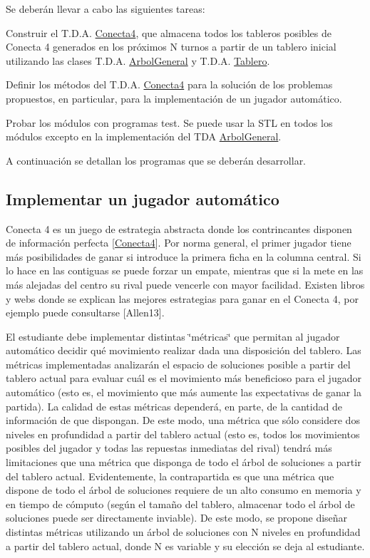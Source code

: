 Se deberán llevar a cabo las siguientes tareas\+:


\begin{DoxyEnumerate}
\item Construir el T.\+D.\+A. \hyperlink{classConecta4}{Conecta4}, que almacena todos los tableros posibles de Conecta 4 generados en los próximos N turnos a partir de un tablero inicial utilizando las clases T.\+D.\+A. \hyperlink{classArbolGeneral}{Arbol\+General} y T.\+D.\+A. \hyperlink{classTablero}{Tablero}.
\item Definir los métodos del T.\+D.\+A. \hyperlink{classConecta4}{Conecta4} para la solución de los problemas propuestos, en particular, para la implementación de un jugador automático.
\item Probar los módulos con programas test. Se puede usar la S\+TL en todos los módulos excepto en la implementación del T\+DA \hyperlink{classArbolGeneral}{Arbol\+General}.
\end{DoxyEnumerate}

A continuación se detallan los programas que se deberán desarrollar.\hypertarget{index_jugador_automatico}{}\subsection{Implementar un jugador automático}\label{index_jugador_automatico}
Conecta 4 es un juego de estrategia abstracta donde los contrincantes disponen de información perfecta \mbox{[}\hyperlink{classConecta4}{Conecta4}\mbox{]}. Por norma general, el primer jugador tiene más posibilidades de ganar si introduce la primera ficha en la columna central. Si lo hace en las contiguas se puede forzar un empate, mientras que si la mete en las más alejadas del centro su rival puede vencerle con mayor facilidad. Existen libros y webs donde se explican las mejores estrategias para ganar en el Conecta 4, por ejemplo puede consultarse \mbox{[}Allen13\mbox{]}.

El estudiante debe implementar distintas \char`\"{}métricas\char`\"{} que permitan al jugador automático decidir qué movimiento realizar dada una disposición del tablero. Las métricas implementadas analizarán el espacio de soluciones posible a partir del tablero actual para evaluar cuál es el movimiento más beneficioso para el jugador automático (esto es, el movimiento que más aumente las expectativas de ganar la partida). La calidad de estas métricas dependerá, en parte, de la cantidad de información de que dispongan. De este modo, una métrica que sólo considere dos niveles en profundidad a partir del tablero actual (esto es, todos los movimientos posibles del jugador y todas las repuestas inmediatas del rival) tendrá más limitaciones que una métrica que disponga de todo el árbol de soluciones a partir del tablero actual. Evidentemente, la contrapartida es que una métrica que dispone de todo el árbol de soluciones requiere de un alto consumo en memoria y en tiempo de cómputo (según el tamaño del tablero, almacenar todo el árbol de soluciones puede ser directamente inviable). De este modo, se propone diseñar distintas métricas utilizando un árbol de soluciones con N niveles en profundidad a partir del tablero actual, donde N es variable y su elección se deja al estudiante.

